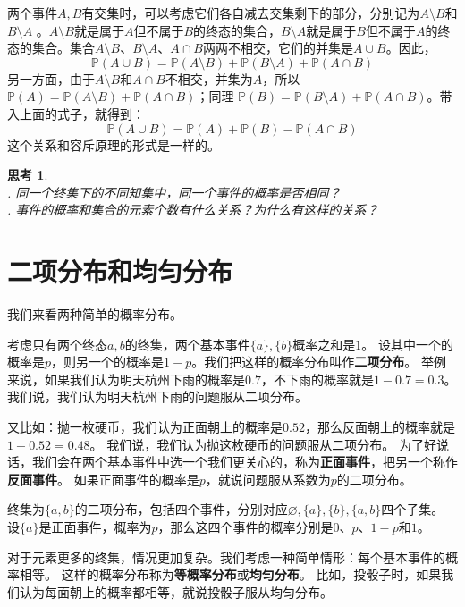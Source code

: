 \documentclass[12pt,UTF8]{ctexbook}
\newtheorem{sk}{思考}[section]
\begin{document}
两个事件$A, B$有交集时，可以考虑它们各自减去交集剩下的部分，分别记为$A\setminus B$和$B\setminus A$ 。$A \setminus B$就是属于$A$但不属于$B$的终态的集合，$B \setminus A$就是属于$B$但不属于$A$的终态的集合。集合$A \setminus B$、$B \setminus A$、$A\cap B$两两不相交，它们的并集是$A\cup B$。因此，
$$
\mathbb{P}(A\cup B) = \mathbb{P}(A \setminus B) + \mathbb{P}(B \setminus A) + \mathbb{P}(A \cap B)
$$
另一方面，由于$A \setminus B$和$A\cap B$不相交，并集为$A$，所以$ \mathbb{P}(A) = \mathbb{P}(A \setminus B) +  \mathbb{P}(A \cap B)$；同理 $\mathbb{P}(B) = \mathbb{P}(B \setminus A) + \mathbb{P}(A \cap B)$。带入上面的式子，就得到：
$$
\mathbb{P}(A\cup B) = \mathbb{P}(A) + \mathbb{P}(B) - \mathbb{P}(A \cap B)
$$
这个关系和容斥原理的形式是一样的。


\begin{sk}
    \mbox{} \\
    . 同一个终集下的不同知集中，同一个事件的概率是否相同？\\
    . 事件的概率和集合的元素个数有什么关系？为什么有这样的关系？
\end{sk}

\section{二项分布和均匀分布}

我们来看两种简单的概率分布。

考虑只有两个终态$a, b$的终集，两个基本事件$\{a\}, \{b\}$概率之和是$1$。
设其中一个的概率是$p$，则另一个的概率是$1-p$。我们把这样的概率分布叫作\textbf{二项分布}。
举例来说，如果我们认为明天杭州下雨的概率是$0.7$，不下雨的概率就是$1-0.7=0.3$。
我们说，我们认为明天杭州下雨的问题服从二项分布。

又比如：抛一枚硬币，我们认为正面朝上的概率是$0.52$，那么反面朝上的概率就是$1 - 0.52 = 0.48$。
我们说，我们认为抛这枚硬币的问题服从二项分布。
为了好说话，我们会在两个基本事件中选一个我们更关心的，称为\textbf{正面事件}，把另一个称作\textbf{反面事件}。
如果正面事件的概率是$p$，就说问题服从系数为$p$的二项分布。

终集为$\{a, b\}$的二项分布，包括四个事件，分别对应$\varnothing, \{a\}, \{b\}, \{a, b\}$四个子集。
设$\{a\}$是正面事件，概率为$p$，那么这四个事件的概率分别是$0$、$p$、$1-p$和$1$。

对于元素更多的终集，情况更加复杂。我们考虑一种简单情形：每个基本事件的概率相等。
这样的概率分布称为\textbf{等概率分布}或\textbf{均匀分布}。
比如，投骰子时，如果我们认为每面朝上的概率都相等，就说投骰子服从均匀分布。
\end{document}

